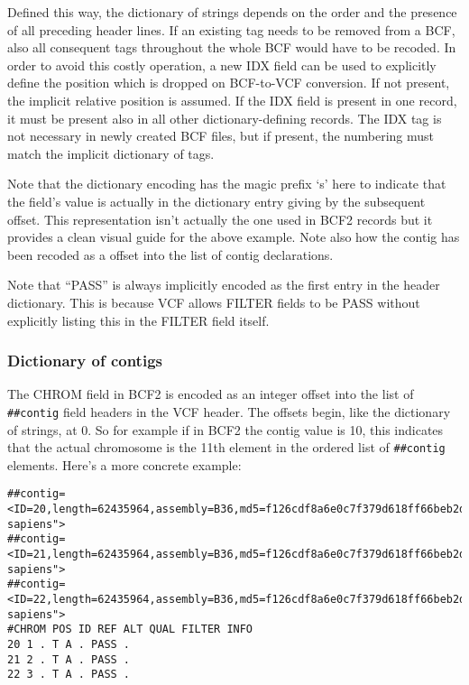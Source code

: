 \documentclass[8pt]{article}
\begin{document}
Defined this way, the dictionary of strings depends on the order and the
presence of all preceding header lines. If an existing tag needs to be removed
from a BCF, also all consequent tags throughout the whole BCF would have to be
recoded. In order to avoid this costly operation, a new IDX field can be used
to explicitly define the position which is dropped on BCF-to-VCF conversion. If
not present, the implicit relative position is assumed. If the IDX field is
present in one record, it must be present also in all other dictionary-defining
records. The IDX tag is not necessary in newly created BCF files, but if
present, the numbering must match the implicit dictionary of tags.

Note that the dictionary encoding has the magic prefix `s' here to indicate that the field's value is actually in the dictionary entry giving by the subsequent offset.  This representation isn't actually the one used in BCF2 records but it provides a clean visual guide for the above example.  Note also how the contig has been recoded as a offset into the list of contig declarations.

Note that ``PASS'' is always implicitly encoded as the first entry in the header dictionary.  This is because VCF allows FILTER fields to be PASS without explicitly listing this in the FILTER field itself.


\subsubsection{Dictionary of contigs}

The CHROM field in BCF2 is encoded as an integer offset into the list of \verb|##contig| field headers in the VCF header.  The offsets begin, like the dictionary of strings, at 0.  So for example if in BCF2 the contig value is 10, this indicates that the actual chromosome is the 11th element in the ordered list of \verb|##contig| elements.  Here's a more concrete example:

\small
\begin{verbatim}
##contig=<ID=20,length=62435964,assembly=B36,md5=f126cdf8a6e0c7f379d618ff66beb2da,species="Homo sapiens">
##contig=<ID=21,length=62435964,assembly=B36,md5=f126cdf8a6e0c7f379d618ff66beb2da,species="Homo sapiens">
##contig=<ID=22,length=62435964,assembly=B36,md5=f126cdf8a6e0c7f379d618ff66beb2da,species="Homo sapiens">
#CHROM POS ID REF ALT QUAL FILTER INFO
20 1 . T A . PASS .
21 2 . T A . PASS .
22 3 . T A . PASS .
\end{verbatim}
\normalsize
\end{document}
